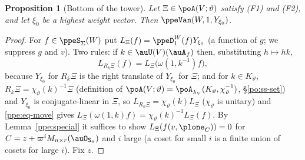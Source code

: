 \documentclass[10pt]{amsart}
\newtheorem{proposition}[theorem]{Proposition}
\theoremstyle{definition}
\theoremstyle{remark}
\begin{document}
\begin{proposition}[Bottom of the tower]\label{ppe:bottom}
Let $\Xi\in\poA(V;\vartheta)$ satisfy (F1) and (F2), and let $\xi_0$ be a highest weight vector.
Then $\ppeVan(W,1,Y_{\xi_0})$.
\end{proposition}
\begin{proof}
For $f\in\ppeS_\Sigma(W)$ put $L_\Xi(f)=\ppeD^W_1(f)Y_{\xi_0}$ (a function of $g$; we suppress $g$
and $v$). Two rules: if $k\in\auU(V)(\auA_f)$ then, substituting $h\mapsto hk$,
\begin{equation}\label{ppe:eq-move}
L_{R_k\Xi}(f)=L_\Xi\bigl(\omega(1,k^{-1})f\bigr),
\end{equation}
because $Y_{\xi_0}$ for $R_k\Xi$ is the right translate of $Y_{\xi_0}$ for $\Xi$; and for $k\in
K_\vartheta$, $R_k\Xi=\chi_\vartheta(k)^{-1}\Xi$ (definition of $\poA(V;\vartheta)=
\poA_{\lambda_V}(K_\vartheta,\chi_\vartheta^{-1})$, \S\ref{po:ss-set}) and $Y_{\xi_0}$ is
conjugate-linear in $\Xi$, so $L_{R_k\Xi}=\chi_\vartheta(k)L_\Xi$ ($\chi_\vartheta$ is unitary) and
\eqref{ppe:eq-move} gives $L_\Xi(\omega(1,k)f)=\chi_\vartheta(k)^{-1}L_\Xi(f)$.
By Lemma~\ref{ppe:special} it suffices to show $L_\Xi(f(v,\plone_C))=0$ for $C=z+\varpi^i
M_{n\times r}(\auO_{\mathsf S_\vartheta})$ and $i$ large (a coset for small $i$ is a finite union
of cosets for large $i$). Fix $z$.


\end{proof}
\end{document}
